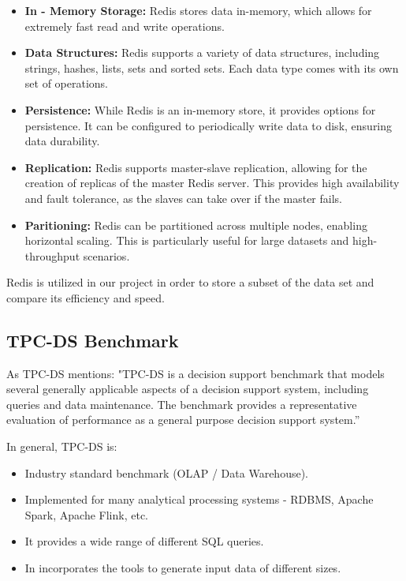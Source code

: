 \documentclass[conference]{IEEEtran}
\begin{document}
\begin{itemize}
    \item \textbf{In - Memory Storage:} Redis stores data in-memory, which allows for extremely fast read and write operations.
    \item \textbf{Data Structures:} Redis supports a variety of data structures, including strings, hashes, lists, sets and sorted sets. Each data type comes with its own set of operations.
    \item \textbf{Persistence:} While Redis is an in-memory store, it provides options for persistence. It can be configured to periodically write data to disk, ensuring data durability.
    \item \textbf{Replication:} Redis supports master-slave replication, allowing for the creation of replicas of the master Redis server. 
    This provides high availability and fault tolerance, as the slaves can take over if the master fails.
    \item \textbf{Paritioning:} Redis can be partitioned across multiple nodes, enabling horizontal scaling. This is particularly useful for large datasets and high-throughput scenarios.
\end{itemize}

Redis is utilized in our project in order to store a subset of the data set and compare its efficiency and speed.

\subsection{TPC-DS Benchmark}

As TPC-DS \cite{b1} mentions: "TPC-DS is a decision support benchmark that models several generally applicable 
aspects of a decision support system, including queries and data maintenance. The benchmark provides a representative evaluation 
of performance as a general purpose decision support system.”

In general, TPC-DS is:

\begin{itemize}
    \item Industry standard benchmark (OLAP / Data Warehouse).
    \item Implemented for many analytical processing systems - RDBMS, Apache Spark, Apache Flink, etc. 
    \item It provides a wide range of different SQL queries.
    \item In incorporates the tools to generate input data of different sizes.
\end{itemize}
\end{document}
